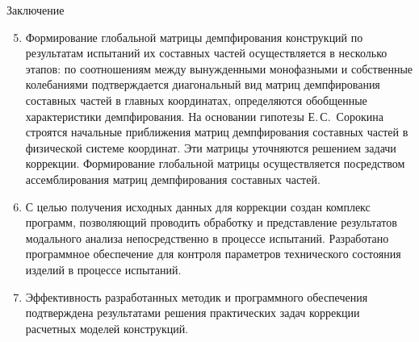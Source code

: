 \begin{frame}{Заключение}
	\begin{enumerate}
		\setcounter{enumi}{4}
		\item Формирование глобальной матрицы демпфирования конструкций по результатам испытаний их составных частей осуществляется в несколько этапов: по соотношениям между вынужденными монофазными и собственные колебаниями подтверждается диагональный вид матриц демпфирования составных частей в главных координатах, определяются обобщенные характеристики демпфирования. На основании гипотезы Е.\,С.~Сорокина строятся начальные приближения матриц демпфирования составных частей в физической системе координат. Эти матрицы уточняются решением задачи коррекции. Формирование глобальной матрицы осуществляется посредством ассемблирования матриц демпфирования составных частей. 
		\item С целью получения исходных данных для коррекции создан комплекс программ, позволяющий проводить обработку и представление результатов модального анализа непосредственно в процессе испытаний. Разработано программное обеспечение для контроля параметров технического состояния изделий в процессе испытаний.
		\item Эффективность разработанных методик и программного обеспечения подтверждена результатами решения практических задач коррекции расчетных моделей конструкций.
	\end{enumerate}
\end{frame}